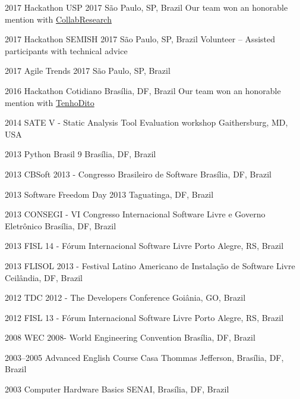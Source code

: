 \documentclass[print]{friggeri-cv}
\begin{document}
\begin{entrylist}


\entry
{2017}
{Hackathon USP 2017}
{São Paulo, SP, Brazil}
  {Our team won an honorable mention with \href{https://devpost.com/software/collab-research}{CollabResearch}}

\entry
{2017}
{Hackathon SEMISH 2017}
{São Paulo, SP, Brazil}
  {Volunteer -- Assisted participants with technical advice}

\entry
{2017}
{Agile Trends 2017}
{São Paulo, SP, Brazil}
  {}

\entry
{2016}
{Hackathon Cotidiano}
{Brasília, DF, Brazil}
  {Our team won an honorable mention with \href{https://github.com/tenhodito}{TenhoDito}}

\end{entrylist}
\begin{entrylist}

\entry
{2014}
{SATE V - Static Analysis Tool Evaluation workshop}
{Gaithersburg, MD, USA}
{}

\entry
{2013}
{Python Brasil 9}
{Brasília, DF, Brazil}
{}

\entry
{2013}
{CBSoft 2013 - Congresso Brasileiro de Software}
{Brasília, DF, Brazil}
{}

\entry
{2013}
{Software Freedom Day 2013}
{Taguatinga, DF, Brazil}
{}

\entry
{2013}
{CONSEGI - VI Congresso Internacional Software Livre e Governo Eletrônico}
{Brasília, DF, Brazil}
{}

\entry
{2013}
{FISL 14 - Fórum Internacional Software Livre}
{Porto Alegre, RS, Brazil}
{}

\entry
{2013}
{FLISOL 2013 - Festival Latino Americano de Instalação de Software Livre}
{Ceilândia, DF, Brazil}
{}

\entry
{2012}
{TDC 2012 - The Developers Conference}
{Goiânia, GO, Brazil}
{}

\entry
{2012}
{FISL 13 - Fórum Internacional Software Livre}
{Porto Alegre, RS, Brazil}
{}

\entry
{2008}
{WEC  2008- World Engineering Convention}
{Brasília, DF, Brazil}
{}

\entry
{2003--2005}
{Advanced English Course}
{Casa Thommas Jefferson, Brasília, DF, Brazil}
{}

\entry
{2003}
{Computer Hardware Basics}
{SENAI, Brasília, DF, Brazil}
{}

\end{entrylist}
\end{document}
